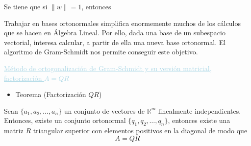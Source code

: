 \documentclass[12pt]{article}
\begin{document}
Se tiene que si $\|w\|=1$, entonces \[\]

\begin{center}
\end{center}
Trabajar en bases ortonormales simplifica enormemente muchos de los cálculos que se hacen en Álgebra Lineal. Por ello, dada una base de un subespacio vectorial, interesa calcular, a partir de ella una nueva base ortonormal. El algoritmo de Gram-Schmidt nos permite conseguir este objetivo.

\textcolor{lightblue}{\underline{Método de ortogonalización de Gram-Schmidt y su versión matricial, factorización $A=QR$}}
\begin{itemize}[label=\color{red}\textbullet, leftmargin=*]
    \item \color{lightblue}Teorema (Factorización $QR$)
\end{itemize}
Sean $\{a_1,a_2,\hdots,a_n\}$ un conjunto de vectores de $\mathbb{R}^m$ linealmente independientes. Entonces, existe un conjunto ortonormal $\{q_1,q_2,\hdots,q_n\}$, entonces existe una matriz $R$ triangular superior con elementos positivos en la diagonal de modo que \[A=QR\]
\end{document}
